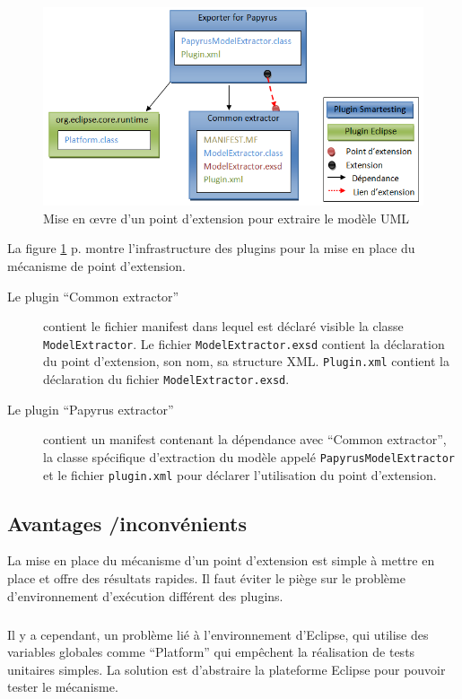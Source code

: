 \begin{figure}[!ht]
\begin{center}
  \includegraphics[scale=.5]{images/UsePapyrusExtensionPoint.png}
  \caption{Mise en \oe vre d'un point d'extension pour extraire le modèle UML}
  \label{figure:UsePapyrusExtensionPoint}
\end{center}
\end{figure}

La figure \ref{figure:UsePapyrusExtensionPoint} p.\pageref{figure:UsePapyrusExtensionPoint} montre l'infrastructure des plugins pour la mise en place du mécanisme de point d'extension.
\begin{description}
  \item [Le plugin ``Common extractor''] contient le fichier manifest dans lequel est déclaré visible la classe \texttt{ModelExtractor}.
Le fichier \texttt{ModelExtractor.exsd} contient la déclaration du point d'extension, son nom, sa structure XML. \texttt{Plugin.xml} contient la déclaration du fichier \texttt{ModelExtractor.exsd}.

\item [Le plugin ``Papyrus extractor''] contient un manifest contenant la dépendance avec ``Common extractor'', la classe spécifique d'extraction du modèle appelé \newline \texttt{PapyrusModelExtractor} et le fichier \texttt{plugin.xml} pour déclarer l'utilisation du point d'extension.
\end{description}

\subsection{Avantages /inconvénients}

La mise en place du mécanisme d'un point d'extension est simple à mettre en place et offre des résultats rapides.
Il faut éviter le piège sur le problème d'environnement d'exécution différent des plugins.

\subparagraph*{}
Il y a cependant, un problème lié à l'environnement d'Eclipse, qui utilise des variables globales comme ``Platform'' qui empêchent la réalisation de tests unitaires simples. 
La solution est d'abstraire la plateforme Eclipse pour pouvoir tester le mécanisme.
